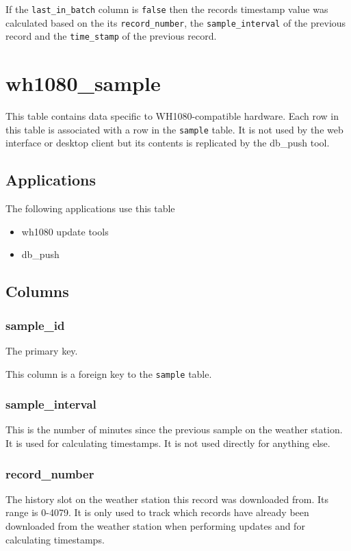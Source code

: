\documentclass[a4paper,10pt]{book}
\begin{document}
If the \verb|last_in_batch| column is \verb|false| then the records timestamp value was calculated based on the its \verb|record_number|, the \verb|sample_interval| of the previous record and the \verb|time_stamp| of the previous record.


\section{wh1080\_sample}
\label{tbl_wh1080_sample}
This table contains data specific to WH1080-compatible hardware. Each row in this table is associated with a row in the \verb|sample| table. It is not used by the web interface or desktop client but its contents is replicated by the db\_push tool.

\subsection{Applications}
The following applications use this table
\begin{itemize}
\item wh1080 update tools
\item db\_push
\end{itemize}

\subsection{Columns}
\subsubsection{sample\_id}
The primary key.

This column is a foreign key to the \verb|sample| table.

\subsubsection{sample\_interval}
This is the number of minutes since the previous sample on the weather station. It is used for calculating timestamps. It is not used directly for anything else.

\subsubsection{record\_number}
The history slot on the weather station this record was downloaded from. Its range is 0-4079. It is only used to track which records have already been downloaded from the weather station when performing updates and for calculating timestamps.
\end{document}
